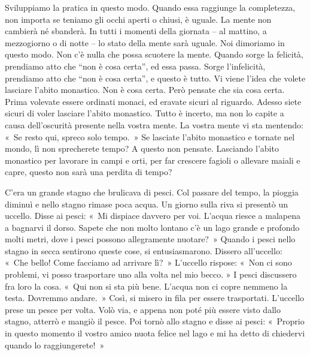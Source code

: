 Sviluppiamo la pratica in questo modo. Quando essa raggiunge la
completezza, non importa se teniamo gli occhi aperti o chiusi, è uguale.
La mente non cambierà né sbanderà. In tutti i momenti della giornata --
al mattino, a mezzogiorno o di notte -- lo stato della mente sarà
uguale. Noi dimoriamo in questo modo. Non c'è nulla che possa scuotere
la mente. Quando sorge la felicità, prendiamo atto che ``non è cosa
certa'', ed essa passa. Sorge l'infelicità, prendiamo atto che ``non è
cosa certa'', e questo è tutto. Vi viene l'idea che volete lasciare
l'abito monastico. Non è cosa certa. Però pensate che sia cosa certa.
Prima volevate essere ordinati monaci, ed eravate sicuri al riguardo.
Adesso siete sicuri di voler lasciare l'abito monastico. Tutto è
incerto, ma non lo capite a causa dell'oscurità presente nella vostra
mente. La vostra mente vi sta mentendo: «~Se resto qui, spreco solo
tempo.~» Se lasciate l'abito monastico e tornate nel mondo, lì non
sprecherete tempo? A questo non pensate. Lasciando l'abito monastico per
lavorare in campi e orti, per far crescere fagioli o allevare maiali e
capre, questo non sarà una perdita di tempo?

C'era un grande stagno che brulicava di pesci. Col passare del tempo, la
pioggia diminuì e nello stagno rimase poca acqua. Un giorno sulla riva
si presentò un uccello. Disse ai pesci: «~Mi dispiace davvero per voi.
L'acqua riesce a malapena a bagnarvi il dorso. Sapete che non molto
lontano c'è un lago grande e profondo molti metri, dove i pesci possono
allegramente nuotare?~» Quando i pesci nello stagno in secca sentirono
queste cose, si entusiasmarono. Dissero all'uccello: «~Che bello! Come
facciamo ad arrivare lì?~» L'uccello rispose: «~Non ci sono problemi, vi
posso trasportare uno alla volta nel mio becco. » I pesci discussero fra
loro la cosa. «~Qui non si sta più bene. L'acqua non ci copre nemmeno la
testa. Dovremmo andare.~» Così, si misero in fila per essere
trasportati. L'uccello prese un pesce per volta. Volò via, e appena non
poté più essere visto dallo stagno, atterrò e mangiò il pesce. Poi tornò
allo stagno e disse ai pesci: «~Proprio in questo momento il vostro
amico nuota felice nel lago e mi ha detto di chiedervi quando lo
raggiungerete!~»

